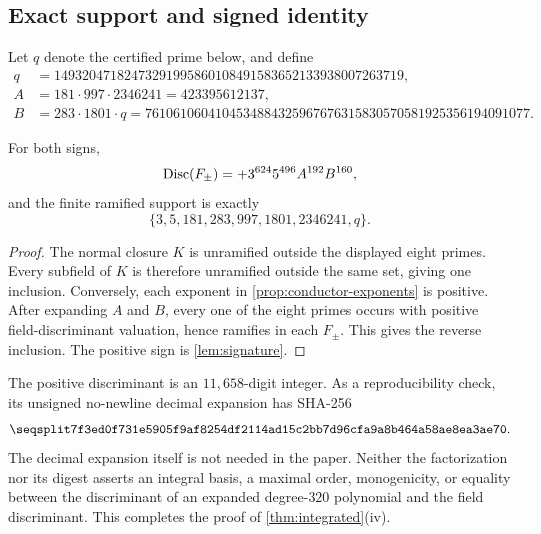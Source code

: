 \subsection{Exact support and signed identity}

Let $q$ denote the certified prime below, and define
\begin{align}
 q&=14932047182473291995860108491583652133938007263719,
 \label{eq:q-definition}\\
 A&=181\cdot997\cdot2346241=423395612137,
 \label{eq:A-definition}\\
 B&=283\cdot1801\cdot q
 =7610610604104534884325967676315830570581925356194091077.
 \label{eq:B-definition}
\end{align}

\begin{corollary}
\label{cor:global-discriminant}
For both signs,
\[
 \operatorname{Disc}(F_\pm)=+3^{624}5^{496}A^{192}B^{160},
\]
and the finite ramified support is exactly
\[
 \{3,5,181,283,997,1801,2346241,q\}.
\]
\end{corollary}

\begin{proof}
The normal closure $K$ is unramified outside the displayed eight primes.
Every subfield of $K$ is therefore unramified outside the same set, giving
one inclusion.  Conversely, each exponent in
\cref{prop:conductor-exponents} is positive.  After expanding $A$ and $B$,
every one of the eight primes occurs with positive field-discriminant
valuation, hence ramifies in each $F_\pm$.  This gives the reverse inclusion.
The positive sign is \cref{lem:signature}.
\end{proof}

The positive discriminant is an $11{,}658$-digit integer.  As a
reproducibility check, its unsigned no-newline decimal expansion has SHA-256
\[
\hexsha{7f3ed0f731e5905f9af8254df2114ad15c2bb7d96cfa9a8b464a58ae8ea3ae70}.
\]
The decimal expansion itself is not needed in the paper.  Neither the
factorization nor its digest asserts an integral basis, a maximal order,
monogenicity, or equality between the discriminant of an expanded
degree-$320$ polynomial and the field discriminant.  This completes the
proof of \cref{thm:integrated}(iv).
